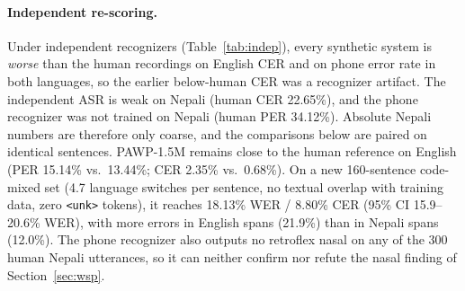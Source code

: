 \paragraph{Independent re-scoring.}
Under independent recognizers (Table~\ref{tab:indep}), every synthetic system is \emph{worse} than the human recordings on English CER and on phone error rate in both languages, so the earlier below-human CER was a recognizer artifact. The independent ASR is weak on Nepali (human CER 22.65\%), and the phone recognizer was not trained on Nepali (human PER 34.12\%). Absolute Nepali numbers are therefore only coarse, and the comparisons below are paired on identical sentences. PAWP-1.5M remains close to the human reference on English (PER 15.14\% vs.\ 13.44\%; CER 2.35\% vs.\ 0.68\%). On a new 160-sentence code-mixed set (4.7 language switches per sentence, no textual overlap with training data, zero \texttt{<unk>} tokens), it reaches 18.13\% WER / 8.80\% CER (95\% CI 15.9--20.6\% WER), with more errors in English spans (21.9\%) than in Nepali spans (12.0\%). The phone recognizer also outputs no retroflex nasal on any of the 300 human Nepali utterances, so it can neither confirm nor refute the nasal finding of Section~\ref{sec:wsp}.

\begin{table}[t]
\centering
\caption{End-to-end parameter footprint (all inference tensors counted) and evaluation on clean \texttt{v3} alignment. Held-out ASR uses a single recognizer ($n=30/30/9$, \texttt{seed=42}); untouched test PER uses \texttt{ctc\_aligner\_v3.pt} ($n=300$ NE + $300$ EN), reporting 3-seed mean $\pm$ std (\texttt{seeds 42, 101, 202}) for \texttt{EXP-015b/c}.}
\label{tab:params}
\footnotesize
\setlength{\tabcolsep}{4pt}
\end{table}

